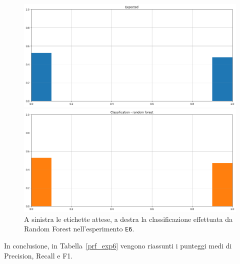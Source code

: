 \documentclass[12pt]{report}
\theoremstyle{definition}
\begin{document}
\begin{figure}
\centering
    \begin{minipage}{0.48\textwidth}
        \includegraphics[width=\linewidth]{images/experiment_beta05_sovrapposti/expected_classification.png}
    \end{minipage}
    \begin{minipage}{0.48\textwidth}
        \includegraphics[width=\linewidth]{images/experiment_beta05_sovrapposti/prediction_classification_rf.png}
    \end{minipage}
    \caption{A sinistra le etichette attese, a destra la classificazione effettuata da Random Forest nell'esperimento \texttt{E6}.}
    \label{rf_class_exp6}
\end{figure} 
In conclusione, in Tabella~\ref{prf_exp6} vengono riassunti i punteggi medi di Precision, Recall e F1.
\end{document}
